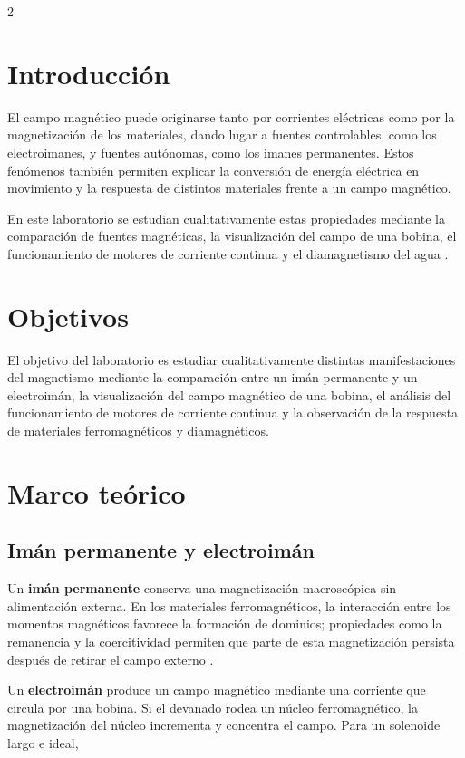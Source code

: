 \documentclass[10pt,letterpaper]{article}
\begin{document}
\begin{multicols}{2}
\raggedcolumns

\section{Introducción}

El campo magnético puede originarse tanto por corrientes eléctricas como por la magnetización de los materiales, dando lugar a fuentes controlables, como los electroimanes, y fuentes autónomas, como los imanes permanentes. Estos fenómenos también permiten explicar la conversión de energía eléctrica en movimiento y la respuesta de distintos materiales frente a un campo magnético.

En este laboratorio se estudian cualitativamente estas propiedades mediante la comparación de fuentes magnéticas, la visualización del campo de una bobina, el funcionamiento de motores de corriente continua y el diamagnetismo del agua \cite{guia2026}.

\section{Objetivos}

El objetivo del laboratorio es estudiar cualitativamente distintas manifestaciones del magnetismo mediante la comparación entre un imán permanente y un electroimán, la visualización del campo magnético de una bobina, el análisis del funcionamiento de motores de corriente continua y la observación de la respuesta de materiales ferromagnéticos y diamagnéticos.

\section{Marco teórico}

\subsection{Imán permanente y electroimán}

Un \textbf{imán permanente} conserva una magnetización macroscópica sin alimentación externa. En los materiales ferromagnéticos, la interacción entre los momentos magnéticos favorece la formación de dominios; propiedades como la remanencia y la coercitividad permiten que parte de esta magnetización persista después de retirar el campo externo \cite{griffiths2017}.

Un \textbf{electroimán} produce un campo magnético mediante una corriente que circula por una bobina. Si el devanado rodea un núcleo ferromagnético, la magnetización del núcleo incrementa y concentra el campo. Para un solenoide largo e ideal,


\end{multicols}
\end{document}
